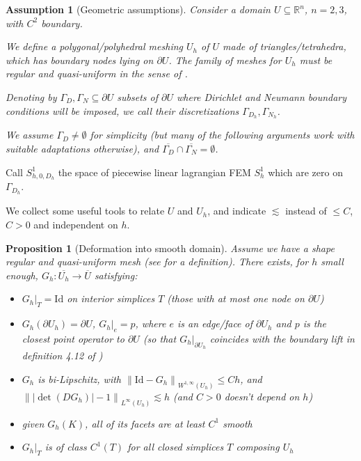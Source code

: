 \documentclass[english,a4paper,9pt,oneside]{scrbook}	%
\theoremstyle{break}
\newtheorem{prop}[equation]{Proposition}
\newtheorem{ass}[equation]{Assumption}
\theoremstyle{remark}
\newcommand{\mR}{\mathbb{R}}
\newcommand{\norm}[1]{\left\lVert#1\right\rVert}
\newcommand{\id}{\text{Id}}
\begin{document}
\begin{appendices}
\begin{ass}[Geometric assumptions]
\label{ass:geo_ass_discr}
Consider a domain $U \subseteq \mR^n$, $n=2,3$, with $C^2$ boundary.

We define a polygonal/polyhedral meshing $U_h$ of $U$ made of triangles/tetrahedra, which has boundary nodes lying on $\partial U$. The family of meshes for $U_h$ must be regular and quasi-uniform in the sense of \cite{brenner_scott}.

Denoting by $\Gamma_D, \Gamma_N \subseteq \partial U$ subsets of $\partial U$ where Dirichlet and Neumann boundary conditions will be imposed, we call their discretizations $\Gamma_{D_h}, \Gamma_{N_h}$.

We assume $\Gamma_D \neq \emptyset $ for simplicity (but many of the following arguments work with suitable adaptations otherwise), and $\overline{\Gamma_D}\cap \overline{\Gamma_N} = \emptyset$.

\end{ass}

Call $S^1_{h,0,D_h} $ the space of piecewise linear lagrangian FEM $S^1_h$ which are zero on $\Gamma_{D_h}$.

We collect some useful tools to relate $U$ and $U_h$, and indicate $\lesssim$ instead of $\leq C$, $C>0$ and independent on $h$.

\begin{prop}[Deformation into smooth domain]
\label{prop:G_h}
Assume we have a shape regular and quasi-uniform mesh (see \cite{brenner_scott} for a definition). There exists, for $h$ small enough, $G_h: \overline{U_h} \rightarrow \overline{U}$ satisfying:

\begin{itemize}
	\item $G_h|_T = \id$ on interior simplices $T$ (those with at most one node on $\partial U$)
	\item $G_h(\partial U_h) = \partial U$, $G_h|_e=p$, where $e$ is an edge/face of $\partial U_h$ and $p$ is the closest point operator to $\partial U$ (so that $G_h|_{\partial U_h}$ coincides with the boundary lift in definition 4.12 of \cite{elliott})
	\item $G_h$ is bi-Lipschitz, with $\norm{\id -G_h}_{W^{1,\infty}(U_h)}\leq C h$, and $\norm{|\det(DG_h)|-1}_{L^\infty(U_h)}\lesssim h$ (and $C>0$ doesn't depend on $h$)
	\item given $G_h(K)$, all of its facets are at least $C^1$ smooth
	\item $G_h|_T$ is of class $C^1(T)$ for all closed simplices $T$ composing $U_h$
\end{itemize}


\end{prop}
\end{appendices}
\end{document}
